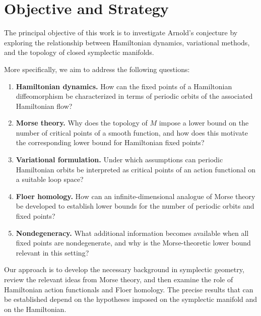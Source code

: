 \documentclass[11pt,a4paper]{article}
\theoremstyle{plain}
\theoremstyle{definition}
\theoremstyle{remark}
\begin{document}
	\section{Objective and Strategy}
	
	The principal objective of this work is to investigate
	Arnold's conjecture by exploring the relationship between
	Hamiltonian dynamics, variational methods, and the topology
	of closed symplectic manifolds.
	
	More specifically, we aim to address the following questions:
	
	\begin{enumerate}[label=\textnormal{(\arabic*)}]
		\item \textbf{Hamiltonian dynamics.}
		How can the fixed points of a Hamiltonian diffeomorphism
		be characterized in terms of periodic orbits of the
		associated Hamiltonian flow?
		
		\item \textbf{Morse theory.}
		Why does the topology of $M$ impose a lower bound on
		the number of critical points of a smooth function,
		and how does this motivate the corresponding lower
		bound for Hamiltonian fixed points?
		
		\item \textbf{Variational formulation.}
		Under which assumptions can periodic Hamiltonian
		orbits be interpreted as critical points of an action
		functional on a suitable loop space?
		
		\item \textbf{Floer homology.}
		How can an infinite-dimensional analogue of Morse
		theory be developed to establish lower bounds for
		the number of periodic orbits and fixed points?
		
		\item \textbf{Nondegeneracy.}
		What additional information becomes available when
		all fixed points are nondegenerate, and why is the
		Morse-theoretic lower bound relevant in this setting?
	\end{enumerate}
	
	Our approach is to develop the necessary background in
	symplectic geometry, review the relevant ideas from Morse
	theory, and then examine the role of Hamiltonian action
	functionals and Floer homology. The precise results that
	can be established depend on the hypotheses imposed on
	the symplectic manifold and on the Hamiltonian.
	
\end{document}

